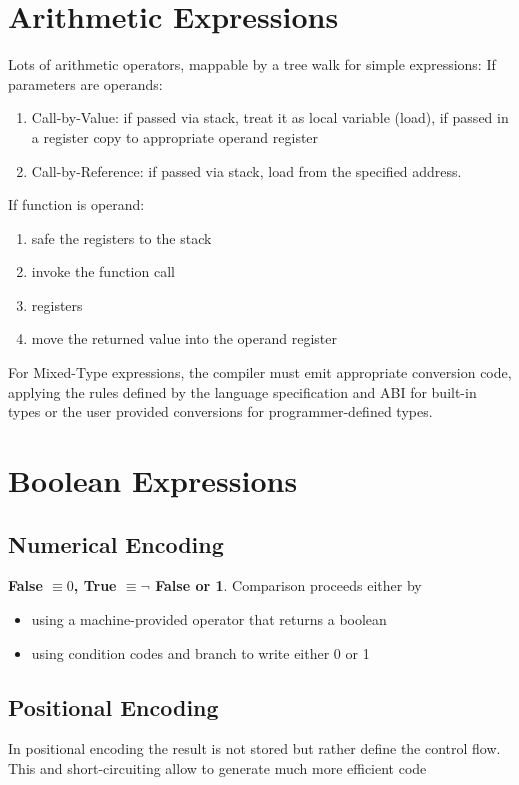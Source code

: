\section{Arithmetic Expressions}
Lots of arithmetic operators, mappable by a tree walk for simple expressions: 
If parameters are operands:
\begin{enumerate}
	\item Call-by-Value: if passed via stack, treat it as local variable (load), if passed in a register copy to appropriate operand register
	\item  Call-by-Reference: if passed via stack, load from the specified address.
\end{enumerate}
If function is operand: 
\begin{enumerate}
	\item safe the registers to the stack
	\item invoke the function call
	\item registers
	\item move the returned value into the operand register
\end{enumerate}
 
For Mixed-Type expressions, the compiler must emit appropriate conversion code, applying the rules defined by the language specification and ABI for built-in types or the user provided conversions for programmer-defined types. \\
 
\section{Boolean Expressions}
\subsection{Numerical Encoding}
\textbf{False $\equiv 0$, True $\equiv \neg$ False or 1}. Comparison proceeds either by 
\begin{itemize}
	\item using a machine-provided operator that returns a boolean
	\item using condition codes and branch to write either 0 or 1
\end{itemize}

\subsection{Positional Encoding}
In positional encoding the result is not stored but rather define the control flow. This and short-circuiting allow to generate much more efficient code

